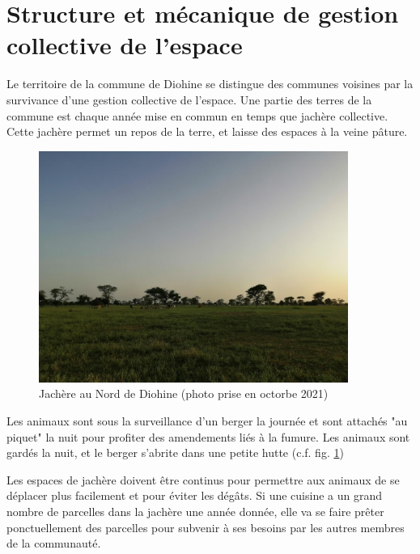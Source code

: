 \section{Structure et mécanique de gestion collective de l'espace}

Le territoire de la commune de Diohine se distingue des communes voisines par la survivance d'une gestion collective de l'espace. Une partie des terres de la commune est chaque année mise en commun en temps que jachère collective. Cette jachère permet un repos de la terre, et laisse des espaces à la veine pâture.

\begin{figure}
  \begin{center}
    \includegraphics[width=0.9\textwidth]{img/jachere.jpg}
  \end{center}
  \caption{Jachère au Nord de Diohine (photo prise en octorbe 2021)}
  \label{fig:photoJachere}
\end{figure}



Les animaux sont  sous la surveillance d'un berger la journée et sont attachés "au piquet" la nuit pour profiter des amendements liés à la fumure. Les animaux sont gardés la nuit, et le berger s'abrite dans une petite hutte (c.f. fig. \ref{fig:photoJachere})

Les espaces de jachère doivent être continus pour permettre aux animaux de se déplacer plus facilement et pour éviter les dégâts. Si une cuisine a un grand nombre de parcelles dans la jachère une année donnée, elle va se faire prêter ponctuellement des parcelles pour subvenir à ses besoins par les autres membres de la communauté.

